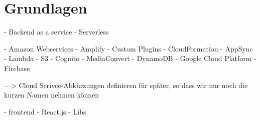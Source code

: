 \chapter{Grundlagen}

- Backend as a service
- Serverless

- Amazon Webservices
  - Amplify
  - Custom Plugins
  - CloudFormation
  - AppSync
  - Lambda
  - S3
  - Cognito
  - MediaConvert
  - DynamoDB
- Google Cloud Platform
  - Firebase

---> Cloud Serivce-Abkürzungen definieren für später, so dass wir nur noch die kurzen Namen nehmen können


- frontend
  - React.js
  - Libs